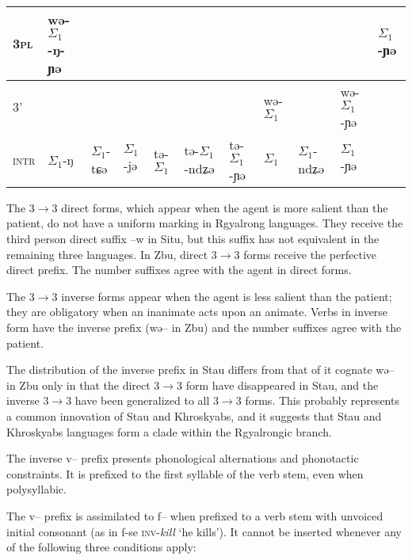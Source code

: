 \documentclass[oldfontcommands,oneside,a4paper,11pt]{article}
\newcommand{\ipa}[1]{{\phon #1}} %
\newcommand{\grise}[1]{\cellcolor{lightgray}\textbf{#1}}
\newcommand{\ra}{$\Sigma_1$}
\begin{document}
\begin{table}[h]
{\begin{tabular}{l|l|l|l|l|l|l|l|l|l|l|}
\textsc{3pl} &  \cellcolor[wave]{500}	\ipa{wə-\ra{}-ŋ-ɲə} & 	\cellcolor[wave]{500} & \cellcolor[wave]{500} & 	\cellcolor[wave]{500} & 	\cellcolor[wave]{500} & 	\cellcolor[wave]{500} & \multicolumn{3}{c|}{\grise{}} &	\ipa{\ra{}-ɲə} \\ 	
\hline
\textsc{3'} & 	\multicolumn{6}{c|}{\grise{}} &\cellcolor[wave]{500}	\ipa{wə-\ra{}} & 	\cellcolor[wave]{500}\ipa{wə-\ra{}-ndʑə} & \cellcolor[wave]{500}	\ipa{wə-\ra{}-ɲə} & 	\grise{} \\	
	\hline	\hline
\textsc{intr}&\ipa{\ra{}-ŋ}&\ipa{\ra{}-tɕə}&\ipa{\ra{}-jə}&\ipa{tə-\ra{}}&\ipa{tə-\ra{}-ndʑə}&\ipa{tə-\ra{}-ɲə}&\ipa{\ra{}}&\ipa{\ra{}-ndʑə} &\ipa{\ra{}-ɲə}& 	\grise{} \\	
	\hline
\end{tabular}}
\end{table}



The 3$\rightarrow$3 direct forms, which appear  when the agent is more salient than the patient, do not have a uniform marking in Rgyalrong languages. They receive the third person direct suffix \ipa{--w} in Situ, but this suffix has not equivalent in the remaining three languages. In Zbu, direct 3$\rightarrow$3 forms receive  the perfective direct prefix. The number suffixes agree with the agent in direct forms.

The 3$\rightarrow$3 inverse forms appear when the agent is less salient than the patient; they are obligatory when an inanimate acts upon an animate. Verbs in inverse form have the inverse prefix (\ipa{wə}-- in Zbu) and the number suffixes agree with the patient.

The distribution of the inverse prefix in Stau   differs from that of it cognate \ipa{wə}-- in Zbu only in that the direct 3$\rightarrow$3 form have disappeared in Stau, and the inverse 3$\rightarrow$3 have been generalized to all 3$\rightarrow$3 forms. This probably represents a common innovation of Stau and Khroskyabs, and it suggests that Stau and Khroskyabs languages form a clade within the Rgyalrongic branch.


The inverse \ipa{v}-- prefix presents phonological alternations and phonotactic constraints. It is prefixed to the first syllable of the verb stem, even when polysyllabic. 

The \ipa{v}-- prefix is assimilated  to \ipa{f}-- when prefixed to a verb stem with unvoiced initial consonant (as in \ipa{f-se} \textsc{inv}-\textit{kill} `he kills'). It cannot be inserted whenever any of the following three conditions apply:
\end{document}
